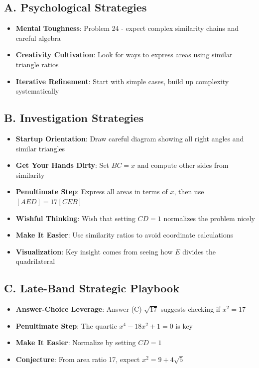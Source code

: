 \documentclass[]{article}
\begin{document}
\begin{strategicbox}
\subsection*{A. Psychological Strategies}
\begin{itemize}[leftmargin=*]
    \item \textbf{Mental Toughness}: Problem 24 - expect complex similarity chains and careful algebra
    \item \textbf{Creativity Cultivation}: Look for ways to express areas using similar triangle ratios
    \item \textbf{Iterative Refinement}: Start with simple cases, build up complexity systematically
\end{itemize}

\subsection*{B. Investigation Strategies}
\begin{itemize}[leftmargin=*]
    \item \textbf{Startup Orientation}: Draw careful diagram showing all right angles and similar triangles
    \item \textbf{Get Your Hands Dirty}: Set $BC = x$ and compute other sides from similarity
    \item \textbf{Penultimate Step}: Express all areas in terms of $x$, then use $[AED] = 17[CEB]$
    \item \textbf{Wishful Thinking}: Wish that setting $CD = 1$ normalizes the problem nicely
    \item \textbf{Make It Easier}: Use similarity ratios to avoid coordinate calculations
    \item \textbf{Visualization}: Key insight comes from seeing how $E$ divides the quadrilateral
\end{itemize}

\subsection*{C. Late-Band Strategic Playbook}
\begin{itemize}[leftmargin=*]
    \item \textbf{Answer-Choice Leverage}: Answer (C) $\sqrt{17}$ suggests checking if $x^2 = 17$
    \item \textbf{Penultimate Step}: The quartic $x^4 - 18x^2 + 1 = 0$ is key
    \item \textbf{Make It Easier}: Normalize by setting $CD = 1$
    \item \textbf{Conjecture}: From area ratio 17, expect $x^2 = 9 + 4\sqrt{5}$
\end{itemize}


\end{strategicbox}
\end{document}
